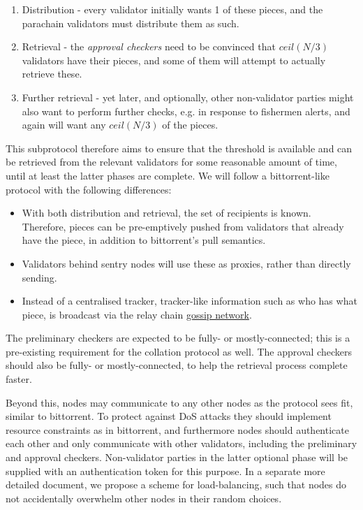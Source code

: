 \documentclass{article}
\begin{document}
\begin{enumerate}
	\item Distribution - every validator initially wants 1 of these pieces, and the parachain validators must distribute them as such.
	\item Retrieval - the \emph{approval checkers} need to be convinced that $ceil(N/3)$ validators have their pieces, and some of them will attempt to actually retrieve these.
	\item Further retrieval - yet later, and optionally, other non-validator parties might also want to perform further checks, e.g. in response to fishermen alerts, and again will want any $ceil(N/3)$ of the pieces.
\end{enumerate}

This subprotocol therefore aims to ensure that the threshold is available and can be retrieved from the relevant validators for some reasonable amount of time, until at least the latter phases are complete. We will follow a bittorrent-like protocol with the following differences:

\begin{itemize}
	\item With both distribution and retrieval, the set of recipients is known. Therefore, pieces can be pre-emptively pushed from validators that already have the piece, in addition to bittorrent's pull semantics.
	\item Validators behind sentry nodes will use these as proxies, rather than directly sending.
	\item Instead of a centralised tracker, tracker-like information such as who has what piece, is broadcast via the relay chain \hyperref[sec:gossiping]{gossip network}.
\end{itemize}

The preliminary checkers are expected to be fully- or mostly-connected; this is a pre-existing requirement for the collation protocol as well. The approval checkers should also be fully- or mostly-connected, to help the retrieval process complete faster.

Beyond this, nodes may communicate to any other nodes as the protocol sees fit, similar to bittorrent. To protect against DoS attacks they should implement resource constraints as in bittorrent, and furthermore nodes should authenticate each other and only communicate with other validators, including the preliminary and approval checkers. Non-validator parties in the latter optional phase will be supplied with an authentication token for this purpose. In a separate more detailed document, we propose a scheme for load-balancing, such that nodes do not accidentally overwhelm other nodes in their random choices.
\end{document}
